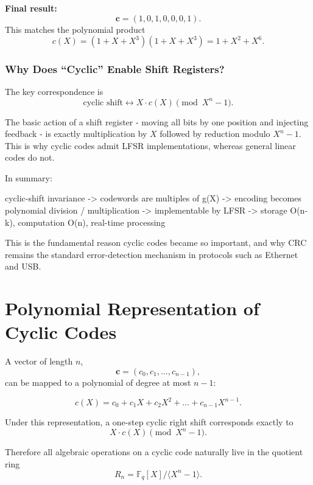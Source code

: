 \documentclass[11pt,oneside]{book}
\newenvironment{Shaded}{}{}
\newcommand{\NormalTok}[1]{#1}
\theoremstyle{plain}
\theoremstyle{definition}
\theoremstyle{remark}
\begin{document}
\textbf{Final result:} \[\mathbf{c}=(1,0,1,0,0,0,1).\] This matches the
polynomial product \[c(X)=(1+X+X^3)(1+X+X^3)=1+X^2+X^6.\]

\subsubsection{Why Does ``Cyclic'' Enable Shift
Registers?}\label{why-does-cyclic-enable-shift-registers}

The key correspondence is
\[\text{cyclic shift} \longleftrightarrow X \cdot c(X) \pmod{X^n-1}.\]

The basic action of a shift register - moving all bits by one position
and injecting feedback - is exactly multiplication by \(X\) followed by
reduction modulo \(X^n-1\). This is why cyclic codes admit LFSR
implementations, whereas general linear codes do not.

In summary:

\begin{Shaded}
\begin{Highlighting}[]
\NormalTok{cyclic{-}shift invariance}
\NormalTok{    {-}\textgreater{} codewords are multiples of g(X)}
\NormalTok{    {-}\textgreater{} encoding becomes polynomial division / multiplication}
\NormalTok{    {-}\textgreater{} implementable by LFSR}
\NormalTok{    {-}\textgreater{} storage O(n{-}k), computation O(n), real{-}time processing}
\end{Highlighting}
\end{Shaded}

This is the fundamental reason cyclic codes became so important, and why
CRC remains the standard error-detection mechanism in protocols such as
Ethernet and USB.


\section{Polynomial Representation of Cyclic Codes}\label{sec:polynomial-representation}

A vector of length \(n\), \[\mathbf{c}=(c_0,c_1,\dots,c_{n-1}),\] can be
mapped to a polynomial of degree at most \(n-1\):

\[c(X)=c_0 + c_1 X + c_2 X^2 + \dots + c_{n-1}X^{n-1}.\]

Under this representation, a one-step cyclic right shift corresponds
exactly to \[X \cdot c(X) \pmod{X^n-1}.\]

Therefore all algebraic operations on a cyclic code naturally live in
the quotient ring \[R_n = \mathbb{F}_q[X]/\langle X^n-1 \rangle.\]
\end{document}
